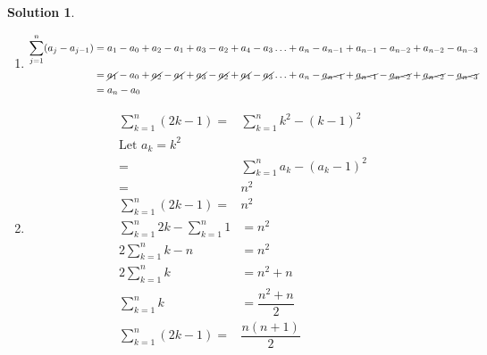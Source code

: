 \documentclass{article}
\theoremstyle{definition}
\newtheorem*{solution}{Solution}
\begin{document}
\begin{solution}\ \\
  \begin{enumerate}
    \item
    \begin{equation*}
        \begin{aligned}
         \sum_{j=1}^n (a_j-a_{j-1})& =a_1-a_0 + a_2-a_1 + a_3-a_2 + a_4-a_3\ldots + a_n - a_{n-1} + a_{n-1} - a_{n-2} + a_{n-2} - a_{n-3} \\
           & =\cancel{a_1}-a_0 + \cancel{a_2}-\cancel{a_1} + \cancel{a_3}-\cancel{a_2} + \cancel{a_4}-\cancel{a_3}\ldots + a_n - \cancel{a_{n-1}} + \cancel{a_{n-1}} - \cancel{a_{n-2}} + \cancel{a_{n-2}} - \cancel{a_{n-3}} \\
           &= a_n-a_0
       \end{aligned}
    \end{equation*}

     \item

      \begin{equation*}
        \begin{aligned}
          \sum_{k=1}^n (2k-1)  = &\sum_{k=1}^n k^{2} - (k-1)^{2} \\
          \text{Let } a_k = k^2 \\
          = &\sum_{k=1}^n a_k - (a_k-1)^{2} \\
          = & n^2 \\
          \sum_{k=1}^n (2k-1)  = & n^2 \\
          \sum_{k=1}^n 2k- \sum_{k=1}^n 1 &= n^2 \\
          2\sum_{k=1}^n k- n &= n^2 \\
          2\sum_{k=1}^n k &= n^2 +n \\
          \sum_{k=1}^n k &= \dfrac{n^2 +n}{2} \\
          \sum_{k=1}^n (2k-1)  = & \dfrac{n(n +1)}{2}
         \end{aligned}
      \end{equation*}


\end{enumerate}
\end{solution}
\end{document}
